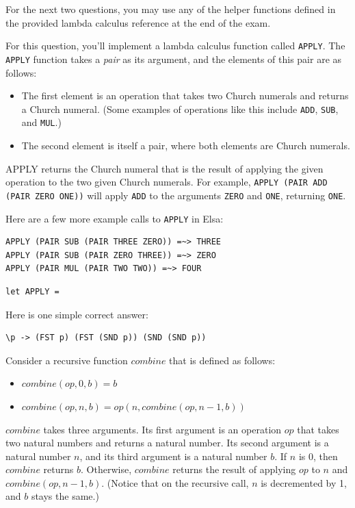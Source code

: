 \documentclass[addpoints]{exam}
\begin{document}
\begin{questions}
\newpage

For the next two questions, you may use any of the helper functions defined in the provided lambda calculus reference at the end of the exam.

\question[4]

For this question, you'll implement a lambda calculus function called \verb|APPLY|.  The \verb|APPLY| function takes a \emph{pair} as its argument, and the elements of this pair are as follows:
\begin{itemize}
\item The first element is an operation that takes two Church numerals and returns a Church numeral. (Some examples of operations like this include \verb|ADD|, \verb|SUB|, and \verb|MUL|.)
\item The second element is itself a pair, where both elements are Church numerals.
\end{itemize}

APPLY returns the Church numeral that is the result of applying the given operation to the two given Church numerals.  For example, \verb|APPLY (PAIR ADD (PAIR ZERO ONE))| will apply \verb|ADD| to the arguments \verb|ZERO| and \verb|ONE|, returning \verb|ONE|.

Here are a few more example calls to \verb|APPLY| in Elsa:
\begin{verbatim}
APPLY (PAIR SUB (PAIR THREE ZERO)) =~> THREE
APPLY (PAIR SUB (PAIR ZERO THREE)) =~> ZERO
APPLY (PAIR MUL (PAIR TWO TWO)) =~> FOUR
\end{verbatim}

\begin{verbatim}
let APPLY = 
\end{verbatim}
\begin{solutionorbox}[1.5in]
Here is one simple correct answer:
\begin{verbatim}
\p -> (FST p) (FST (SND p)) (SND (SND p))
\end{verbatim}
\end{solutionorbox}

\question Consider a recursive function $\mathit{combine}$ that is defined as follows:
\begin{itemize}
\item $\mathit{combine}(\mathit{op}, 0, b) = b$
\item $\mathit{combine}(\mathit{op}, n, b) = \mathit{op}(n, \mathit{combine}(\mathit{op}, n-1, b))$
\end{itemize}

$\mathit{combine}$ takes three arguments. Its first argument is an operation $\mathit{op}$ that takes two natural numbers and returns a natural number. Its second argument is a natural number $n$, and its third argument is a natural number $b$.  If $n$ is 0, then $\mathit{combine}$ returns $b$.  Otherwise, $\mathit{combine}$ returns the result of applying $\mathit{op}$ to $n$ and $\mathit{combine}(\mathit{op}, n-1, b)$.  (Notice that on the recursive call, $n$ is decremented by 1, and $b$ stays the same.)


\end{questions}
\end{document}
